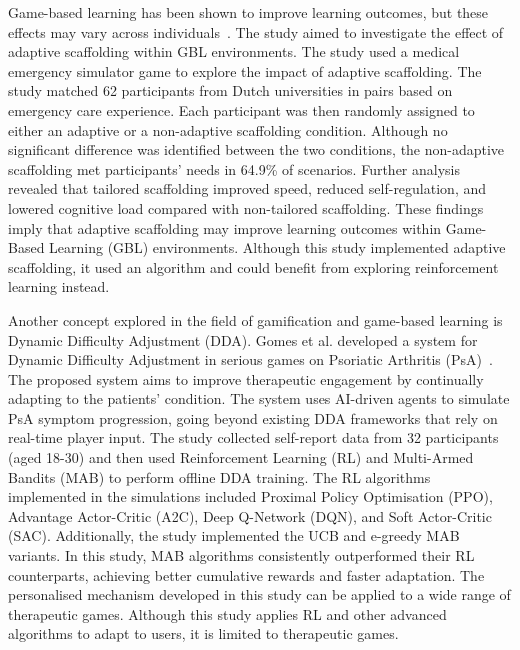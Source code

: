 \documentclass[12pt,a4paper]{report}
\begin{document}
\quad Game-based learning has been shown to improve learning outcomes, but these effects may vary across individuals~\cite{10}. The study aimed to investigate the effect of adaptive scaffolding within GBL environments. The study used a medical emergency simulator game to explore the impact of adaptive scaffolding. The study matched 62 participants from Dutch universities in pairs based on emergency care experience. Each participant was then randomly assigned to either an adaptive or a non-adaptive scaffolding condition. Although no significant difference was identified between the two conditions, the non-adaptive scaffolding met participants’ needs in 64.9\% of scenarios. Further analysis revealed that tailored scaffolding improved speed, reduced self-regulation, and lowered cognitive load compared with non-tailored scaffolding. These findings imply that adaptive scaffolding may improve learning outcomes within Game-Based Learning (GBL) environments. Although this study implemented adaptive scaffolding, it used an algorithm and could benefit from exploring reinforcement learning instead. 

\quad Another concept explored in the field of gamification and game-based learning is Dynamic Difficulty Adjustment (DDA). Gomes et al. developed a system for Dynamic Difficulty Adjustment in serious games on Psoriatic Arthritis (PsA)~\cite{11}. The proposed system aims to improve therapeutic engagement by continually adapting to the patients’ condition. The system uses AI-driven agents to simulate PsA symptom progression, going beyond existing DDA frameworks that rely on real-time player input. The study collected self-report data from 32 participants (aged 18-30) and then used Reinforcement Learning (RL) and Multi-Armed Bandits (MAB) to perform offline DDA training. The RL algorithms implemented in the simulations included Proximal Policy Optimisation (PPO), Advantage Actor-Critic (A2C), Deep Q-Network (DQN), and Soft Actor-Critic (SAC). Additionally, the study implemented the UCB and e-greedy MAB variants. In this study, MAB algorithms consistently outperformed their RL counterparts, achieving better cumulative rewards and faster adaptation. The personalised mechanism developed in this study can be applied to a wide range of therapeutic games. Although this study applies RL and other advanced algorithms to adapt to users, it is limited to therapeutic games.
\end{document}
